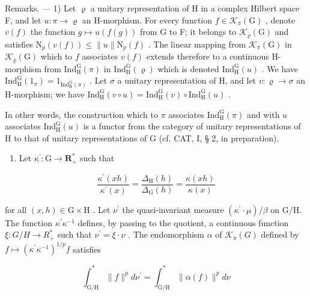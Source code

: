  Remarks. --- 1) Let \(\varrho\) a unitary representation of H in a complex Hilbert space F, and let \(u\colon\pi\to\varrho\) an H-morphism. For every function \(f\in\mathcal{K}_{\overline{\pi}}(\mathrm{G})\) , denote \(v(f)\) the function \(g\mapsto u(f(g))\) from G to F; it belongs to \(\mathcal{K}_{\overline{\varrho}}(\mathrm{G})\) and satisfies \(\mathrm{N}_{p}(v(f))\leqslant\|u\|\mathrm{N}_{p}(f)\) . The linear mapping from \(\mathcal{K}_{\overline{\pi}}(\mathrm{G})\) in \(\mathcal{K}_{\overline{\varrho}}(\mathrm{G})\) which to \(f\) associates \(v(f)\) extends therefore to a continuous H-morphism from \(\mathrm{Ind}_{\mathrm{H}}^{\mathrm{G}}(\pi)\) in \(\mathrm{Ind}_{\mathrm{H}}^{\mathrm{G}}(\varrho)\) which is denoted \(\mathrm{Ind}_{\mathrm{H}}^{\mathrm{G}}(u)\) . We have \(\mathrm{Ind}_{\mathrm{H}}^{\mathrm{G}}(1_{\pi})=1_{\mathrm{Ind}_{\mathrm{H}}^{\mathrm{G}}(\pi)}\) . Let \(\sigma\) a unitary representation of H, and let \(v\colon\varrho\to\sigma\) an H-morphism; we have \(\mathrm{Ind}_{\mathrm{H}}^{\mathrm{G}}(v\circ u)=\mathrm{Ind}_{\mathrm{H}}^{\mathrm{G}}(v)\circ\mathrm{Ind}_{\mathrm{H}}^{\mathrm{G}}(u)\) .

In other words, the construction which to \(\pi\) associates \(\mathrm{Ind}_{\mathrm{H}}^{\mathrm{G}}(\pi)\) and with \(u\) associates \(\mathrm{Ind}_{\mathrm{H}}^{\mathrm{G}}(u)\) is a functor from the category of unitary representations of H to that of unitary representations of G (cf. CAT, I, § 2, in preparation).

\begin{enumerate}
\def\labelenumi{\arabic{enumi})}
\setcounter{enumi}{1}
\tightlist
\item
  Let \(\kappa^{\prime}\colon \mathrm{G}\to \mathbf{R}_{+}^{*}\) such that
\end{enumerate}

\[
\frac {\kappa^ {\prime} (x h)}{\kappa^ {\prime} (x)} = \frac {\Delta_ {\mathrm{H}} (h)}{\Delta_ {\mathrm{G}} (h)} = \frac {\kappa (x h)}{\kappa (x)}
\]

 for all \((x,h)\in\mathrm{G}\times\mathrm{H}\) . Let \(\nu^{\prime}\) the quasi-invariant measure \((\kappa^{\prime}\cdot\mu)/\beta\) on G/H. The function \(\kappa^{\prime}\kappa^{-1}\) defines, by passing to the quotient, a continuous function \(\xi\colon G/H\to R_{+}^{*}\) such that \(\nu^{\prime}=\xi\cdot\nu\) . The endomorphism \(\alpha\) of \(\mathcal{K}_{\pi}(G)\) defined by \(f\mapsto(\kappa^{\prime}\kappa^{-1})^{1/p}f\) satisfies

\[
\int_ {\mathrm{G} / \mathrm{H}} ^ {*} \| f \| ^ {p} d \nu^ {\prime} = \int_ {\mathrm{G} / \mathrm{H}} ^ {*} \| \alpha (f) \| ^ {p} d \nu
\]

